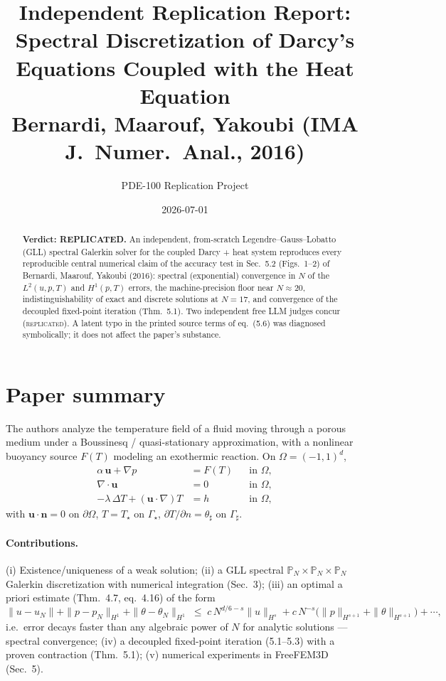 \documentclass[11pt]{article}
\title{Independent Replication Report:\\
Spectral Discretization of Darcy's Equations Coupled with the Heat Equation\\
{\large Bernardi, Maarouf, Yakoubi (IMA J.\ Numer.\ Anal., 2016)}}
\author{PDE-100 Replication Project}
\date{2026-07-01}
\begin{document}
\maketitle

\begin{abstract}
\noindent\textbf{Verdict: REPLICATED.} An independent, from-scratch Legendre--Gauss--Lobatto (GLL)
spectral Galerkin solver for the coupled Darcy + heat system reproduces every reproducible central
numerical claim of the accuracy test in Sec.~5.2 (Figs.~1--2) of Bernardi, Maarouf, Yakoubi
(2016): spectral (exponential) convergence in $N$ of the $L^2(u,p,T)$ and $H^1(p,T)$ errors,
the machine-precision floor near $N\!\approx\!20$, indistinguishability of exact and discrete
solutions at $N=17$, and convergence of the decoupled fixed-point iteration (Thm.~5.1). Two
independent free LLM judges concur (\textsc{replicated}). A latent typo in the printed source
terms of eq.~(5.6) was diagnosed symbolically; it does not affect the paper's substance.
\end{abstract}

\section{Paper summary}
\label{sec:paper}
The authors analyze the temperature field of a fluid moving through a porous medium under a
Boussinesq / quasi-stationary approximation, with a nonlinear buoyancy source $F(T)$ modeling an
exothermic reaction. On $\Omega=(-1,1)^d$,
\begin{align}
  \alpha\,\mathbf{u} + \nabla p &= F(T) &&\text{in }\Omega,\\
  \nabla\!\cdot\!\mathbf{u} &= 0        &&\text{in }\Omega,\\
  -\lambda\,\Delta T + (\mathbf{u}\!\cdot\!\nabla)T &= h &&\text{in }\Omega,
\end{align}
with $\mathbf{u}\!\cdot\!\mathbf{n}=0$ on $\partial\Omega$, $T=T_\star$ on $\Gamma_\star$,
$\partial T/\partial n=\theta_\sharp$ on $\Gamma_\sharp$.

\paragraph{Contributions.}
(i) Existence/uniqueness of a weak solution; (ii) a GLL spectral $\mathbb{P}_N\times\mathbb{P}_N
\times\mathbb{P}_N$ Galerkin discretization with numerical integration (Sec.~3); (iii) an optimal
a priori estimate (Thm.~4.7, eq.~4.16) of the form
\[
  \|u-u_N\| + \|p-p_N\|_{H^1} + \|\theta-\theta_N\|_{H^1}
  \;\le\; c\,N^{d/6-s}\|u\|_{H^s} + c\,N^{-s}\bigl(\|p\|_{H^{s+1}}+\|\theta\|_{H^{s+1}}\bigr)+\cdots,
\]
i.e.\ error decays faster than any algebraic power of $N$ for analytic solutions --- spectral
convergence; (iv) a decoupled fixed-point iteration (5.1--5.3) with a proven contraction
(Thm.~5.1); (v) numerical experiments in FreeFEM3D (Sec.~5).
\end{document}
